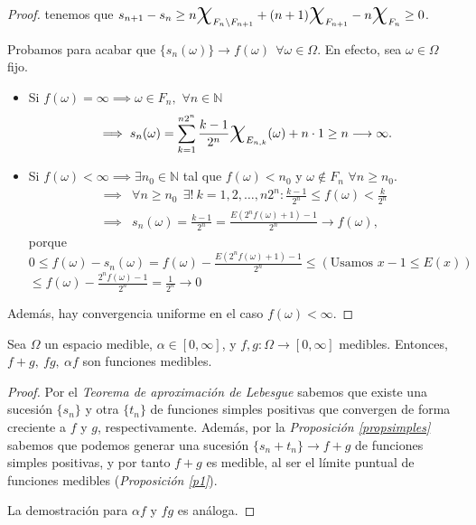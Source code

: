 \begin{proof}
tenemos que $\displaystyle s_{n+1}-s_n \geq  n \text{\huge{$\chi$}}_{F_{n}\setminus F_{n+1}}+ (n+1) \text{\huge{$\chi$}}_{F_{n+1}} - n \text{\huge{$\chi$}}_{F_n} \geq 0$.


Probamos para acabar que $\{ s_n(\omega)\} \to f(\omega) \ \ \forall \omega\in\Omega$. En efecto, sea $\omega\in\Omega$ fijo.
 \begin{itemize}
 \item Si $f(\omega)=\infty \implies \omega\in F_n, $ $\forall n\in \mathbb N$
 \[
 \implies s_n(\omega) =\sum_{k=1}^{n2^n} \frac{k-1}{2^n} \text{\huge{$\chi$}}_{E_{n,k}}(\omega) + n \cdot1\geq n\longrightarrow \infty .
 \]
 \item Si $f(\omega)<\infty \implies \exists n_0\in\mathbb N$ tal que $f(\omega)< n_0$ y $\omega\not\in F_n$ $\forall n\geq n_0$.
 \[
 \begin{aligned}
\implies& \forall n\geq n_0 \ \ \exists ! \ k= 1,2,\dots,n2^n : \frac{k-1}{2^n} \leq f(\omega) < \frac{k}{2^n}
\\
 \implies& s_n(\omega) = \frac{k-1}{2^n} = \frac{E(2^n f(\omega)+1)-1}{2^n} \longrightarrow f(\omega),
 \end{aligned}
  \]
porque $\displaystyle 0\leq f(\omega) - s_n(\omega) = f(\omega) - \frac{E(2^n f(\omega)+1)-1}{2^n} \le \left(\text{Usamos } x-1\leq E(x)\right)$\\ $\displaystyle \leq f(\omega) - \frac{2^n f(\omega)-1}{2^n}  = \frac{1}{2^n}\longrightarrow 0$
 \end{itemize}
\vspace{0.5em}
Además, hay convergencia uniforme en el caso $f(\omega) <\infty$.
\end{proof}

\begin{ncor} \label{arit_medibles} Sea $\Omega$ un espacio medible, \mbox{$\alpha \in [0,\infty]$}, y $f,g : \Omega \to [0,\infty]$ medibles. Entonces, $f + g, \ fg, \ \alpha f$ son funciones medibles.
\end{ncor}

  \begin{proof}
    Por el \textit{Teorema de aproximación de Lebesgue} sabemos que existe una sucesión $\{s_n\}$ y otra $\{t_n\}$ de funciones simples positivas que convergen de forma creciente a $f$ y $g$, respectivamente. Además, por la \textit{Proposición \ref{propsimples}} sabemos que podemos generar una sucesión $\{s_n+t_n\} \to f+g$ de funciones simples positivas, y por tanto $f+g$ es medible, al ser el límite puntual de funciones medibles (\textit{Proposición \ref{p1}}).

    La demostración para $ \alpha f$ y $fg$ es análoga.
  \end{proof}


